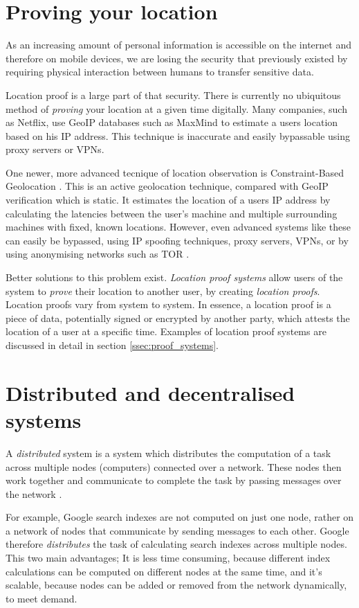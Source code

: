 \section{Proving your location}
As an increasing amount of personal information is accessible on the internet and therefore on mobile devices, we are losing the security that previously existed by requiring physical interaction between humans to transfer sensitive data.

Location proof is a large part of that security. There is currently no ubiquitous method of \textit{proving} your location at a given time digitally. Many companies, such as Netflix, use GeoIP databases such as MaxMind \cite{maxmind} to estimate a users location based on his IP address. This technique is inaccurate and easily bypassable using proxy servers or VPNs.

One newer, more advanced tecnique of location observation is Constraint-Based Geolocation \cite{constraint-based}. This is an active geolocation technique, compared with GeoIP verification which is static. It estimates the location of a users IP address by calculating the latencies between the user's machine and multiple surrounding machines with fixed, known locations. However, even advanced systems like these can easily be bypassed, using IP spoofing techniques, proxy servers, VPNs, or by using anonymising networks such as TOR \cite{tor}.

Better solutions to this problem exist. \textit{Location proof systems} allow users of the system to \textit{prove} their location to another user, by creating \textit{location proofs}. Location proofs vary from system to system. In essence, a location proof is a piece of data, potentially signed or encrypted by another party, which attests the location of a user at a specific time. Examples of location proof systems are discussed in detail in section \ref{ssec:proof_systems}.

\section{Distributed and decentralised systems}
A \textit{distributed} system is a system which distributes the computation of a task across multiple nodes (computers) connected over a network. These nodes then work together and communicate to complete the task by passing messages over the network \cite{distributed}.

For example, Google search indexes are not computed on just one node, rather on a network of nodes that communicate by sending messages to each other. Google therefore \textit{distributes} the task of calculating search indexes across multiple nodes. This two main advantages; It is less time consuming, because different index calculations can be computed on different nodes at the same time, and it's scalable, because nodes can be added or removed from the network dynamically, to meet demand.

